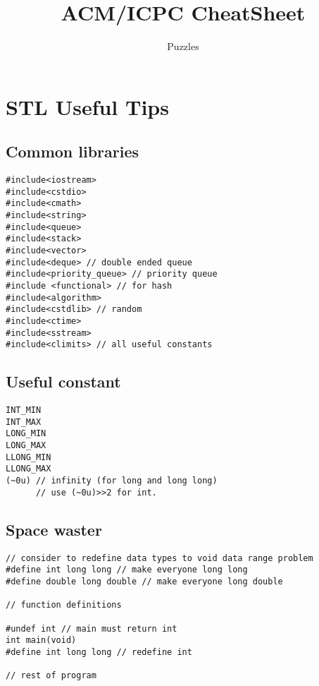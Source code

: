 \documentclass[a4paper]{article}
\title{\textbf{ACM/ICPC CheatSheet}}
\author{Puzzles}
\date{}
\begin{document}
\maketitle
\thispagestyle{empty}
	
{\footnotesize\tableofcontents}

\section{STL Useful Tips}

\subsection{Common libraries}
\begin{verbatim}
#include<iostream>
#include<cstdio>
#include<cmath>
#include<string>
#include<queue>
#include<stack>
#include<vector>
#include<deque> // double ended queue
#include<priority_queue> // priority queue
#include <functional> // for hash
#include<algorithm>
#include<cstdlib> // random
#include<ctime>
#include<sstream>
#include<climits> // all useful constants 
\end{verbatim}

\subsection{Useful constant}

\begin{verbatim}
INT_MIN
INT_MAX
LONG_MIN
LONG_MAX
LLONG_MIN
LLONG_MAX
(~0u) // infinity (for long and long long)
      // use (~0u)>>2 for int.
\end{verbatim}

\subsection{Space waster}

\begin{verbatim}
// consider to redefine data types to void data range problem
#define int long long // make everyone long long
#define double long double // make everyone long double

// function definitions

#undef int // main must return int
int main(void)
#define int long long // redefine int

// rest of program
\end{verbatim}
\end{document}

